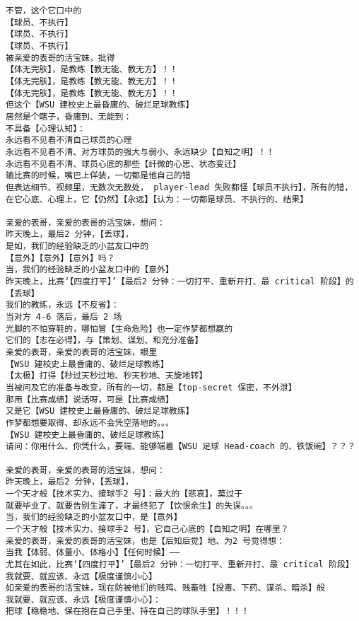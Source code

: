 \documentclass[9pt, b5paper]{article}
\begin{document}
\begin{verbatim}
不管，这个它口中的
【球员、不执行】
【球员、不执行】
【球员、不执行】
被亲爱的表哥的活宝妹，批得
【体无完肤】，是教练【教无能、教无方】！！
【体无完肤】，是教练【教无能、教无方】！！
【体无完肤】，是教练【教无能、教无方】！！
但这个【WSU 建校史上最昏庸的、破烂足球教练】
居然是个瞎子，昏庸到、无能到：
不具备【心理认知】：
永远看不见看不清自己球员的心理
永远看不见看不清、对方球员的强大与弱小、永远缺少【自知之明】！！
永远看不见看不清、球员心底的那些【纤微的心思、状态变迁】
输比赛的时候，嘴巴上佯装，一切都是他自己的错
但表达细节、视频里，无数次无数处， player-lead 失败都怪【球员不执行】，所有的错，
在它心底、心理上，它【仍然】【永远】【认为：一切都是球员、不执行的、结果】

亲爱的表哥，亲爱的表哥的活宝妹，想问：
昨天晚上，最后2 分钟，【丢球】，
是如，我们的经验缺乏的小盆友口中的
【意外】【意外】【意外】吗？
当，我们的经验缺乏的小盆友口中的【意外】
昨天晚上，比赛‘【四度打平】’【最后2 分钟：一切打平、重新开打、最 critical 阶段】的【丢球】
我们的教练，永远【不反省】：
当对方 4-6 落后，最后 2 场
光脚的不怕穿鞋的，哪怕冒【生命危险】也一定作梦都想赢的
它们的【志在必得】，与【策划、谋划、和充分准备】
亲爱的表哥，亲爱的表哥的活宝妹，眼里
【WSU 建校史上最昏庸的、破烂足球教练】
【太极】打得【秒过天秒过地、秒天秒地、天旋地转】
当被问及它的准备与改变，所有的一切，都是【top-secret 保密，不外泄】
那用【比赛成绩】说话呀，可是【比赛成绩】
又是它【WSU 建校史上最昏庸的、破烂足球教练】
作梦都想要取得、却永远不会凭空落地的。。。
【WSU 建校史上最昏庸的、破烂足球教练】
请问：你用什么、你凭什么，要端、能够端着【WSU 足球 Head-coach 的、铁饭碗】？？？

亲爱的表哥，亲爱的表哥的活宝妹，想问：
昨天晚上，最后2 分钟，【丢球】，
一个天才般【技术实力、接球手2 号】：最大的【悲哀】，莫过于
就要毕业了、就要告别生漄了，才最终犯了【饮恨余生】的失误。。。
当，我们的经验缺乏的小盆友口中，是【意外】
一个天才般【技术实力、接球手2 号】，它自己心底的【自知之明】在哪里？
亲爱的表哥，亲爱的表哥的活宝妹，也是【后知后觉】地、为2 号觉得想：
当我【体弱、体量小、体格小】【任何时候】——
尤其在如此，比赛‘【四度打平】’【最后2 分钟：一切打平、重新开打、最 critical 阶段】
我就要、就应该、永远【极度谨慎小心】
如亲爱的表哥的活宝妹，现在防被他们的贱鸡、贱畜牲【投毒、下药、谋杀、暗杀】般
我就要、就应该、永远【极度谨慎小心】：
把球【稳稳地、保在抱在自己手里、持在自己的球队手里】！！！


\end{verbatim}
\end{document}

